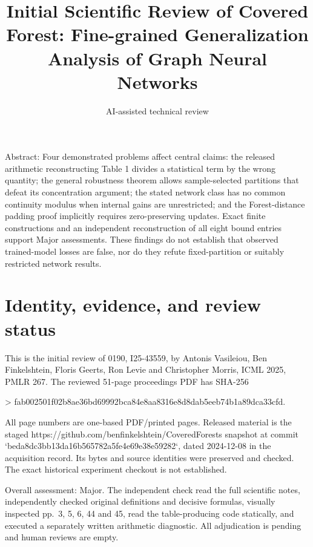 \documentclass[10pt]{article}
\title{Initial Scientific Review of
Covered Forest: Fine-grained Generalization Analysis of Graph Neural Networks}
\author{AI-assisted technical review}
\date{}
\begin{document}
\maketitle
Abstract: Four demonstrated problems affect central claims: the released arithmetic reconstructing Table 1 divides a statistical term by the wrong quantity; the general robustness theorem allows sample-selected partitions that defeat its concentration argument; the stated network class has no common continuity modulus when internal gains are unrestricted; and the Forest-distance padding proof implicitly requires zero-preserving updates. Exact finite constructions and an independent reconstruction of all eight bound entries support Major assessments. These findings do not establish that observed trained-model losses are false, nor do they refute fixed-partition or suitably restricted network results.\par
\section*{Identity, evidence, and review status}
This is the initial review of 0190, I25-43559, by Antonis Vasileiou, Ben Finkelshtein, Floris Geerts, Ron Levie and Christopher Morris, ICML 2025, PMLR 267. The reviewed 51-page proceedings PDF has SHA-256\par
> fab002501f02b8ae36bd69992bca84e8aa8316e8d8dab5eeb74b1a89dca33cfd.\par
All page numbers are one-based PDF/printed pages. Released material is the staged https://github.com/benfinkelshtein/CoveredForests snapshot at commit `beda8dc3bb13da16b565782a5fe4e69e38e59282`, dated 2024-12-08 in the acquisition record. Its bytes and source identities were preserved and checked. The exact historical experiment checkout is not established.\par
Overall assessment: Major. The independent check read the full scientific notes, independently checked original definitions and decisive formulas, visually inspected pp. 3, 5, 6, 44 and 45, read the table-producing code statically, and executed a separately written arithmetic diagnostic. All adjudication is pending and human reviews are empty.\par
\end{document}
